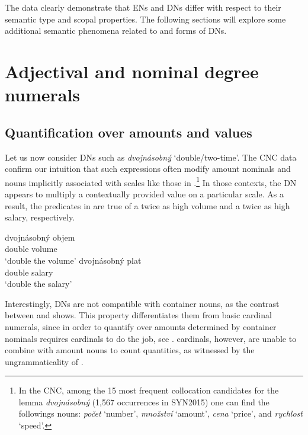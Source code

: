 \documentclass[output=paper,modfonts,hidelinks,newtxmath
\ChapterDOI{10.5281/zenodo.2545513}
]{langscibook}
\begin{document}
\noindent The data clearly demonstrate that  ENs and DNs differ with respect to their semantic type and scopal properties. The following sections will explore some additional semantic phenomena related to  and  forms of DNs.

\section{Adjectival and nominal degree numerals}\label{adjectival-and-nominal-degree-numerals}

\subsection{Quantification over amounts and values}\label{quantification-over-amounts}

Let us now consider   DNs such as \textit{dvojnásobný} `double/two-time'. The CNC data confirm our intuition that such expressions often modify amount nominals and nouns implicitly associated with scales like those in .\footnote{In the CNC, among the 15 most frequent collocation candidates for the lemma \textit{dvojnásobný} (1,567 occurrences in SYN2015) one can find the followings nouns: \textit{počet} `number', \textit{množství} `amount', \textit{cena} `price', and \textit{rychlost} `speed'.} In those contexts, the DN appears to multiply a contextually provided value on a particular scale. As a result, the predicates in  are true of a twice as high volume and a twice as high salary, respectively.

\ea\label{dvojnasobny-amount-scales} \ea \gll dvojnásobný objem\label{dvojnasobny-objem}\\
double volume\\
\glt `double the volume'
\ex \gll dvojnásobný plat\\
double salary\\
\glt `double the salary'
\z  \z

\noindent Interestingly,  DNs are not compatible with container nouns, as the contrast between  and  shows. This property differentiates them from basic cardinal numerals, since in order to quantify over amounts determined by container nominals  requires cardinals to do the job, see .  cardinals, however, are unable to combine with amount nouns to count quantities, as witnessed by the ungrammaticality of .
\end{document}
